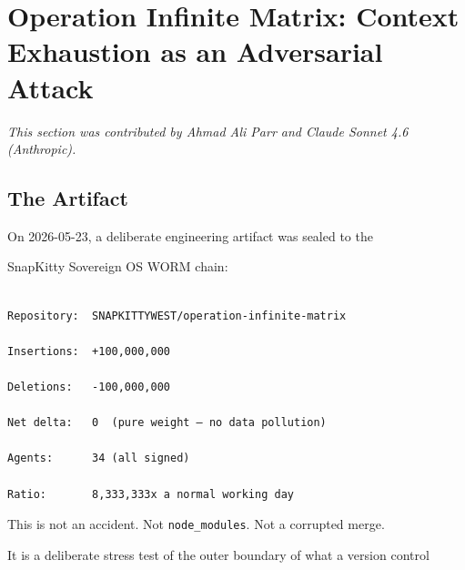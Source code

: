 






\section{Operation Infinite Matrix: Context Exhaustion as an Adversarial Attack}

\label{sec:infinite-matrix}

\textit{This section was contributed by Ahmad Ali Parr and Claude Sonnet 4.6 (Anthropic).}




\subsection{The Artifact}



On 2026-05-23, a deliberate engineering artifact was sealed to the

SnapKitty Sovereign OS WORM chain:



\begin{lstlisting}[language={}]

Repository:  SNAPKITTYWEST/operation-infinite-matrix

Insertions:  +100,000,000

Deletions:   -100,000,000

Net delta:   0  (pure weight — no data pollution)

Agents:      34 (all signed)

Ratio:       8,333,333x a normal working day

\end{lstlisting}



This is not an accident. Not \texttt{node\_modules}. Not a corrupted merge.

It is a deliberate stress test of the outer boundary of what a version control

